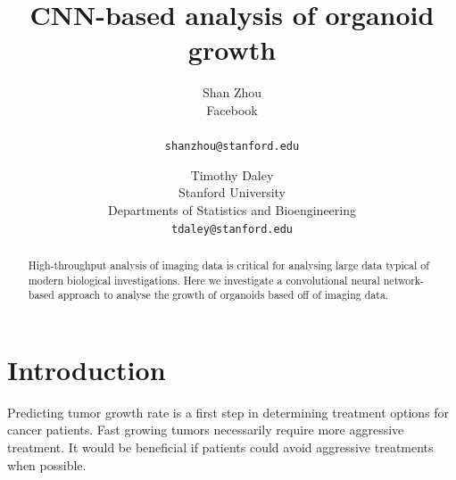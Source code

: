 \documentclass[10pt,twocolumn,letterpaper]{article}
\begin{document}
\title{CNN-based analysis of organoid growth}

\author{Shan Zhou \\
Facebook \\
\\
{\tt\small shanzhou@stanford.edu}
\and
Timothy Daley \\
Stanford University \\
Departments of Statistics and Bioengineering \\
{\tt\small tdaley@stanford.edu}
}

\maketitle

\begin{abstract}
High-throughput analysis of imaging data is critical for analysing large data typical of modern biological investigations.  Here we investigate a convolutional neural network-based approach to analyse the growth of organoids based off of imaging data.  
\end{abstract}

\section{Introduction}

Predicting tumor growth rate is a first step in determining treatment options for cancer patients.  Fast growing tumors necessarily require more aggressive treatment.  It would be beneficial if patients could avoid aggressive treatments when possible.  
\end{document}
